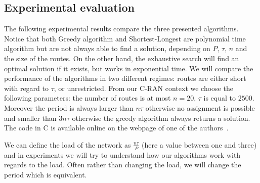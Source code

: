 \documentclass[a4paper,10pt]{article}
\begin{document}
%        
%        
%       


    \subsection{Experimental evaluation}\label{sec:exp_PAZL}
      
      The following experimental results compare the three presented algorithms.
      Notice that both Greedy algorithm and Shortest-Longest are polynomial time algorithm but are not always able to find a solution, depending on $P$, $\tau$, $n$ and the size of the routes. On the other hand, the exhaustive search will find an optimal solution if it exists, but works in exponential time. We will compare the performance of the algorithms in two different regimes: routes are either short with regard to $\tau$, or unrestricted.
      From our C-RAN context we choose the following parameters: the number of routes 
      is at most $n = 20$, $\tau$ is equal to $2500$. Moreover the period is always larger than $n\tau$ otherwise no assignment is possible and smaller than $3n\tau$ otherwise the greedy algorithm always returns a solution. 
      The code in C is available online on the webpage of one of the authors~\cite{webpage}.
      
      We can define the load of the network as $\frac{n\tau}{P}$ (here a value between one and three) and in experiments we will try to understand how our algorithms work with regards to the load. Often rather than changing the load, we will change the period which is equivalent. 
      
\end{document}
